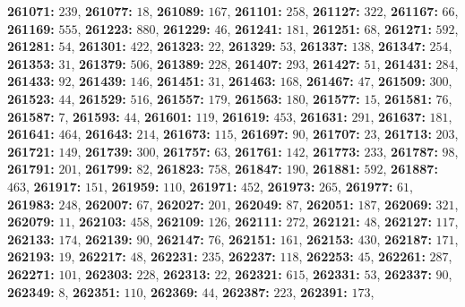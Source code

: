 \textsf{\bfseries 261071:} $239$, \textsf{\bfseries 261077:} $18$, \textsf{\bfseries 261089:} $167$, \textsf{\bfseries 261101:} $258$, \textsf{\bfseries 261127:} $322$, \textsf{\bfseries 261167:} $66$, \textsf{\bfseries 261169:} $555$, \textsf{\bfseries 261223:} $880$, \textsf{\bfseries 261229:} $46$, \textsf{\bfseries 261241:} $181$, \textsf{\bfseries 261251:} $68$, \textsf{\bfseries 261271:} $592$, \textsf{\bfseries 261281:} $54$, \textsf{\bfseries 261301:} $422$, \textsf{\bfseries 261323:} $22$, \textsf{\bfseries 261329:} $53$, \textsf{\bfseries 261337:} $138$, \textsf{\bfseries 261347:} $254$, \textsf{\bfseries 261353:} $31$, \textsf{\bfseries 261379:} $506$, \textsf{\bfseries 261389:} $228$, \textsf{\bfseries 261407:} $293$, \textsf{\bfseries 261427:} $51$, \textsf{\bfseries 261431:} $284$, \textsf{\bfseries 261433:} $92$, \textsf{\bfseries 261439:} $146$, \textsf{\bfseries 261451:} $31$, \textsf{\bfseries 261463:} $168$, \textsf{\bfseries 261467:} $47$, \textsf{\bfseries 261509:} $300$, \textsf{\bfseries 261523:} $44$, \textsf{\bfseries 261529:} $516$, \textsf{\bfseries 261557:} $179$, \textsf{\bfseries 261563:} $180$, \textsf{\bfseries 261577:} $15$, \textsf{\bfseries 261581:} $76$, \textsf{\bfseries 261587:} $7$, \textsf{\bfseries 261593:} $44$, \textsf{\bfseries 261601:} $119$, \textsf{\bfseries 261619:} $453$, \textsf{\bfseries 261631:} $291$, \textsf{\bfseries 261637:} $181$, \textsf{\bfseries 261641:} $464$, \textsf{\bfseries 261643:} $214$, \textsf{\bfseries 261673:} $115$, \textsf{\bfseries 261697:} $90$, \textsf{\bfseries 261707:} $23$, \textsf{\bfseries 261713:} $203$, \textsf{\bfseries 261721:} $149$, \textsf{\bfseries 261739:} $300$, \textsf{\bfseries 261757:} $63$, \textsf{\bfseries 261761:} $142$, \textsf{\bfseries 261773:} $233$, \textsf{\bfseries 261787:} $98$, \textsf{\bfseries 261791:} $201$, \textsf{\bfseries 261799:} $82$, \textsf{\bfseries 261823:} $758$, \textsf{\bfseries 261847:} $190$, \textsf{\bfseries 261881:} $592$, \textsf{\bfseries 261887:} $463$, \textsf{\bfseries 261917:} $151$, \textsf{\bfseries 261959:} $110$, \textsf{\bfseries 261971:} $452$, \textsf{\bfseries 261973:} $265$, \textsf{\bfseries 261977:} $61$, \textsf{\bfseries 261983:} $248$, \textsf{\bfseries 262007:} $67$, \textsf{\bfseries 262027:} $201$, \textsf{\bfseries 262049:} $87$, \textsf{\bfseries 262051:} $187$, \textsf{\bfseries 262069:} $321$, \textsf{\bfseries 262079:} $11$, \textsf{\bfseries 262103:} $458$, \textsf{\bfseries 262109:} $126$, \textsf{\bfseries 262111:} $272$, \textsf{\bfseries 262121:} $48$, \textsf{\bfseries 262127:} $117$, \textsf{\bfseries 262133:} $174$, \textsf{\bfseries 262139:} $90$, \textsf{\bfseries 262147:} $76$, \textsf{\bfseries 262151:} $161$, \textsf{\bfseries 262153:} $430$, \textsf{\bfseries 262187:} $171$, \textsf{\bfseries 262193:} $19$, \textsf{\bfseries 262217:} $48$, \textsf{\bfseries 262231:} $235$, \textsf{\bfseries 262237:} $118$, \textsf{\bfseries 262253:} $45$, \textsf{\bfseries 262261:} $287$, \textsf{\bfseries 262271:} $101$, \textsf{\bfseries 262303:} $228$, \textsf{\bfseries 262313:} $22$, \textsf{\bfseries 262321:} $615$, \textsf{\bfseries 262331:} $53$, \textsf{\bfseries 262337:} $90$, \textsf{\bfseries 262349:} $8$, \textsf{\bfseries 262351:} $110$, \textsf{\bfseries 262369:} $44$, \textsf{\bfseries 262387:} $223$, \textsf{\bfseries 262391:} $173$, 
